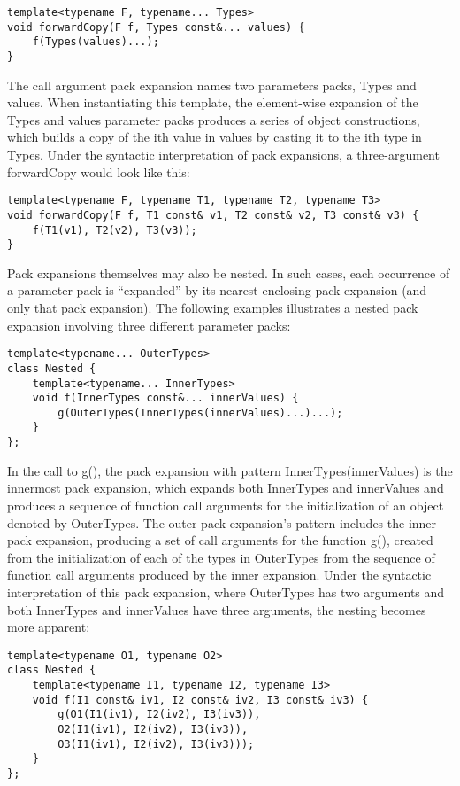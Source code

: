 \begin{lstlisting}[style=styleCXX]
template<typename F, typename... Types>
void forwardCopy(F f, Types const&... values) {
	f(Types(values)...);
}
\end{lstlisting}

The call argument pack expansion names two parameters packs, Types and values. When instantiating this template, the element-wise expansion of the Types and values parameter packs produces a series of object constructions, which builds a copy of the ith value in values by casting it to the ith type in Types. Under the syntactic interpretation of pack expansions, a three-argument forwardCopy would look like this:

\begin{lstlisting}[style=styleCXX]
template<typename F, typename T1, typename T2, typename T3>
void forwardCopy(F f, T1 const& v1, T2 const& v2, T3 const& v3) {
	f(T1(v1), T2(v2), T3(v3));
}
\end{lstlisting}

Pack expansions themselves may also be nested. In such cases, each occurrence of a parameter pack is “expanded” by its nearest enclosing pack expansion (and only that pack expansion). The following examples illustrates a nested pack expansion involving three different parameter packs:

\begin{lstlisting}[style=styleCXX]
template<typename... OuterTypes>
class Nested {
	template<typename... InnerTypes>
	void f(InnerTypes const&... innerValues) {
		g(OuterTypes(InnerTypes(innerValues)...)...);
	}
};
\end{lstlisting}

In the call to g(), the pack expansion with pattern InnerTypes(innerValues) is the innermost pack expansion, which expands both InnerTypes and innerValues and produces a sequence of function call arguments for the initialization of an object denoted by OuterTypes. The outer pack expansion’s pattern includes the inner pack expansion, producing a set of call arguments for the function g(), created from the initialization of each of the types in OuterTypes from the sequence of function call arguments produced by the inner expansion. Under the syntactic interpretation of this pack expansion, where OuterTypes has two arguments and both InnerTypes and innerValues have three arguments, the nesting becomes more apparent:

\begin{lstlisting}[style=styleCXX]
template<typename O1, typename O2>
class Nested {
	template<typename I1, typename I2, typename I3>
	void f(I1 const& iv1, I2 const& iv2, I3 const& iv3) {
		g(O1(I1(iv1), I2(iv2), I3(iv3)),
		O2(I1(iv1), I2(iv2), I3(iv3)),
		O3(I1(iv1), I2(iv2), I3(iv3)));
	}
};
\end{lstlisting}

